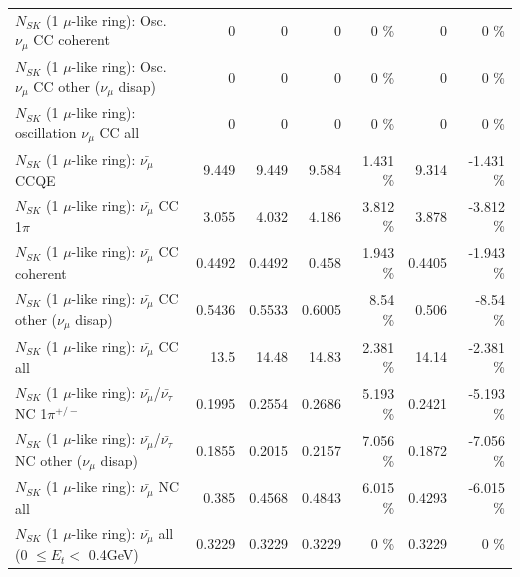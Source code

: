 \begin{table}
\begin{tabular}{| l | r | r | r  r | r  r |}
                        $N_{SK}$ (1 $\mu$-like ring): Osc. $\nu_\mu$ CC coherent &               0 &               0 &               0 &        0 \%  &               0 &        0 \%  \\ 
         $N_{SK}$ (1 $\mu$-like ring): Osc. $\nu_\mu$ CC other ($\nu_\mu$ disap) &               0 &               0 &               0 &        0 \%  &               0 &        0 \%  \\ 
                      $N_{SK}$ (1 $\mu$-like ring): oscillation $\nu_\mu$ CC all &               0 &               0 &               0 &        0 \%  &               0 &        0 \%  \\ 
\hline
\hline
                              $N_{SK}$ (1 $\mu$-like ring): $\bar{\nu_\mu}$ CCQE &           9.449 &           9.449 &           9.584 &    1.431 \%  &           9.314 &   -1.431 \%  \\ 
                         $N_{SK}$ (1 $\mu$-like ring): $\bar{\nu_\mu}$ CC 1$\pi$ &           3.055 &           4.032 &           4.186 &    3.812 \%  &           3.878 &   -3.812 \%  \\ 
                       $N_{SK}$ (1 $\mu$-like ring): $\bar{\nu_\mu}$ CC coherent &          0.4492 &          0.4492 &           0.458 &    1.943 \%  &          0.4405 &   -1.943 \%  \\ 
        $N_{SK}$ (1 $\mu$-like ring): $\bar{\nu_\mu}$ CC other ($\nu_\mu$ disap) &          0.5436 &          0.5533 &          0.6005 &     8.54 \%  &           0.506 &    -8.54 \%  \\ 
                          $N_{SK}$ (1 $\mu$-like ring): $\bar{\nu_{\mu}}$ CC all &            13.5 &           14.48 &           14.83 &    2.381 \%  &           14.14 &   -2.381 \%  \\ 
\hline
  $N_{SK}$ (1 $\mu$-like ring): $\bar{\nu_\mu}$/$\bar{\nu_\tau}$ NC 1$\pi^{+/-}$ &          0.1995 &          0.2554 &          0.2686 &    5.193 \%  &          0.2421 &   -5.193 \%  \\ 
$N_{SK}$ (1 $\mu$-like ring): $\bar{\nu_\mu}$/$\bar{\nu_\tau}$ NC other ($\nu_\mu$ disap) &          0.1855 &          0.2015 &          0.2157 &    7.056 \%  &          0.1872 &   -7.056 \%  \\ 
                          $N_{SK}$ (1 $\mu$-like ring): $\bar{\nu_{\mu}}$ NC all &           0.385 &          0.4568 &          0.4843 &    6.015 \%  &          0.4293 &   -6.015 \%  \\ 
\hline
   $N_{SK}$ (1 $\mu$-like ring): $\bar{\nu_{\mu}}$ all (0 $\leq E_{t} <$ 0.4GeV) &          0.3229 &          0.3229 &          0.3229 &        0 \%  &          0.3229 &        0 \%  \\ 

\end{tabular}
\end{table}
